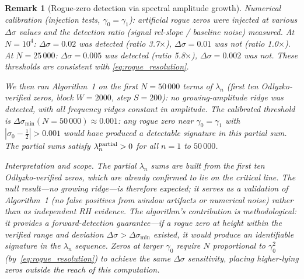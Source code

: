 \documentclass[11pt]{article}
\newtheorem{remark}[theorem]{Remark}
\begin{document}
\begin{remark}[Rogue-zero detection via spectral amplitude growth]
Numerical calibration (injection tests, $\gamma_0 = \gamma_1$):
artificial rogue zeros were injected at various $\Delta\sigma$ values and the detection ratio
(signal rel-slope / baseline noise) measured.  At $N = 10^4$: $\Delta\sigma = 0.02$ was
detected (ratio 3.7$\times$), $\Delta\sigma = 0.01$ was not (ratio 1.0$\times$).  At $N = 25\,000$:
$\Delta\sigma = 0.005$ was detected (ratio 5.8$\times$), $\Delta\sigma = 0.002$ was not.
These thresholds are consistent with \eqref{eq:rogue_resolution}.

We then ran Algorithm~1 on the first $N = 50\,000$ terms of $\lambda_n$ (first ten
Odlyzko-verified zeros, block $W = 2000$, step $S = 200$): \emph{no growing-amplitude
ridge was detected}, with all frequency ridges constant in amplitude.  The calibrated threshold
is $\Delta\sigma_{\min}(N=50\,000) \approx 0.001$: any rogue zero near $\gamma_0 = \gamma_1$
with $|\sigma_0 - \tfrac{1}{2}| > 0.001$ would have produced a detectable signature in this
partial sum.  The partial sums satisfy $\lambda_n^{\rm partial} > 0$ for all $n = 1$ to $50\,000$.

\emph{Interpretation and scope.}  The partial $\lambda_n$ sums are built from the first ten
Odlyzko-verified zeros, which are already confirmed to lie on the critical line.  The null
result—no growing ridge—is therefore \emph{expected}; it serves as a validation of Algorithm~1
(no false positives from window artifacts or numerical noise) rather than as independent RH
evidence.  The algorithm's contribution is methodological: it provides a forward-detection
guarantee—\emph{if} a rogue zero at height within the verified range and deviation
$\Delta\sigma > \Delta\sigma_{\min}$ existed, it \emph{would} produce an identifiable signature
in the $\lambda_n$ sequence.  Zeros at larger $\gamma_0$ require $N$ proportional to
$\gamma_0^2$ (by~\eqref{eq:rogue_resolution}) to achieve the same $\Delta\sigma$ sensitivity,
placing higher-lying zeros outside the reach of this computation.
\end{remark}
\end{document}
